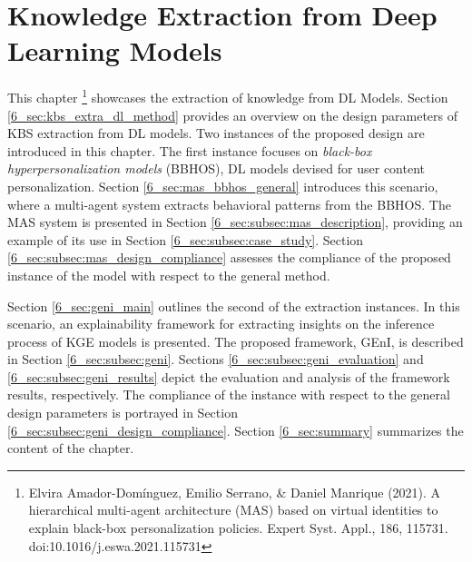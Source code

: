 \chapter{Knowledge Extraction from Deep Learning Models}
\label{chap:kbsextractiondl}
This chapter \footnote{Elvira Amador-Domínguez, Emilio Serrano, & Daniel Manrique (2021). A hierarchical multi-agent architecture (MAS) based on virtual identities to explain black-box personalization policies. Expert Syst. Appl., 186, 115731. doi:10.1016/j.eswa.2021.115731} showcases the extraction of knowledge from DL Models. Section \ref{6_sec:kbs_extra_dl_method} provides an overview on the design parameters of KBS extraction from DL models. Two instances of the proposed design are introduced in this chapter. The first instance focuses on \textit{black-box hyperpersonalization models} (BBHOS), DL models devised for user content personalization. Section \ref{6_sec:mas_bbhos_general} introduces this scenario, where a multi-agent system extracts behavioral patterns from the BBHOS. The MAS system is presented in Section \ref{6_sec:subsec:mas_description}, providing an example of its use in Section \ref{6_sec:subsec:case_study}. Section \ref{6_sec:subsec:mas_design_compliance} assesses the compliance of the proposed instance of the model with respect to the general method. 

Section \ref{6_sec:geni_main} outlines the second of the extraction instances. In this scenario, an explainability framework for extracting insights on the inference process of KGE models is presented. The proposed framework, GEnI, is described in Section \ref{6_sec:subsec:geni}. Sections \ref{6_sec:subsec:geni_evaluation} and \ref{6_sec:subsec:geni_results} depict the evaluation and analysis of the framework results, respectively. The compliance of the instance with respect to the general design parameters is portrayed in Section \ref{6_sec:subsec:geni_design_compliance}. Section \ref{6_sec:summary} summarizes the content of the chapter.


